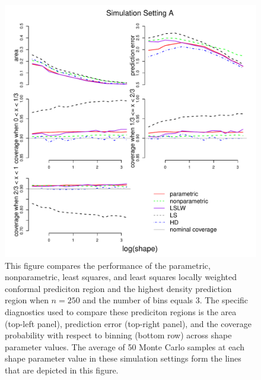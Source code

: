 \documentclass[11pt]{article}\usepackage[]{graphicx}\usepackage[]{color}
\makeatletter
\def\maxwidth{ %
  \ifdim\Gin@nat@width>\linewidth
    \linewidth
  \else
    \Gin@nat@width
  \fi
}
\newenvironment{knitrout}{}{} %
\makeatother
\begin{document}
\newpage
\begin{figure}[h!]
\begin{center}
\begin{knitrout}
\color{fgcolor}
\includegraphics[width=\maxwidth]{figure/Fig-gamma-250-1} 

\end{knitrout}
\end{center}
\caption{This figure compares the performance of the 
  parametric,
  nonparametric,
  least squares, and 
  least squares locally weighted conformal prediciton region and the 
  highest density prediction region when $n = 250$ and the number of bins 
  equals 3.  
  The specific diagnostics used to compare these prediciton regions is the 
    area (top-left panel),
    prediction error (top-right panel), and
    the coverage probability with respect to binning (bottom row) 
    across shape parameter values.
  The average of 50 Monte Carlo samples at each shape parameter value in 
  these simulation settings form the lines that are depicted in this figure.}
\label{Fig:gamma.250}
\end{figure}
\end{document}
